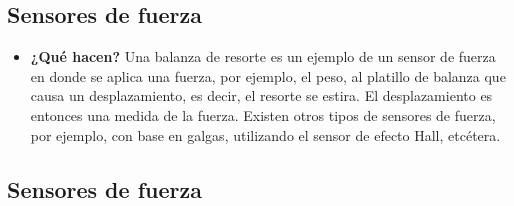\subsection*{Sensores de fuerza} 
\begin{itemize}
	\item \textbf{¿Qué hacen?} Una balanza de resorte es un ejemplo de un sensor de fuerza en donde se aplica una fuerza, por ejemplo, el peso, al platillo de balanza que causa un desplazamiento, es decir, el resorte se estira. El desplazamiento es entonces una medida de la fuerza. Existen otros tipos de sensores de fuerza, por ejemplo, con base en galgas, utilizando el sensor de efecto Hall, etcétera. \cite{BFMX_SensoresInternosRobot}
\end{itemize}
\subsection{Sensores de fuerza}
